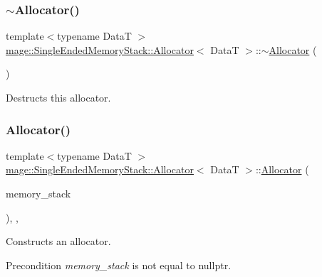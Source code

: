 \subsubsection{\texorpdfstring{$\sim$\+Allocator()}{~Allocator()}}
{\footnotesize\ttfamily template$<$typename DataT $>$ \\
\hyperlink{structmage_1_1_single_ended_memory_stack_1_1_allocator}{mage\+::\+Single\+Ended\+Memory\+Stack\+::\+Allocator}$<$ DataT $>$\+::$\sim$\hyperlink{structmage_1_1_single_ended_memory_stack_1_1_allocator}{Allocator} (\begin{DoxyParamCaption}{ }\end{DoxyParamCaption})\hspace{0.3cm}{\ttfamily [default]}}

Destructs this allocator. \hypertarget{structmage_1_1_single_ended_memory_stack_1_1_allocator_a991173b1fccf74994dc9298b3cffb795}{}\label{structmage_1_1_single_ended_memory_stack_1_1_allocator_a991173b1fccf74994dc9298b3cffb795} 
\subsubsection{\texorpdfstring{Allocator()}{Allocator()}\hspace{0.1cm}{\footnotesize\ttfamily [4/4]}}
{\footnotesize\ttfamily template$<$typename DataT $>$ \\
\hyperlink{structmage_1_1_single_ended_memory_stack_1_1_allocator}{mage\+::\+Single\+Ended\+Memory\+Stack\+::\+Allocator}$<$ DataT $>$\+::\hyperlink{structmage_1_1_single_ended_memory_stack_1_1_allocator}{Allocator} (\begin{DoxyParamCaption}\item[{\hyperlink{classmage_1_1_single_ended_memory_stack}{Single\+Ended\+Memory\+Stack} $\ast$}]{memory\+\_\+stack }\end{DoxyParamCaption})\hspace{0.3cm}{\ttfamily [explicit]}, {\ttfamily [private]}, {\ttfamily [noexcept]}}

Constructs an allocator.

\begin{DoxyPrecond}{Precondition}
{\itshape memory\+\_\+stack} is not equal to {\ttfamily nullptr}. 
\end{DoxyPrecond}


